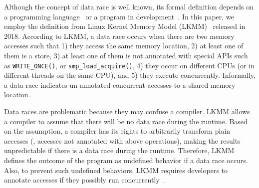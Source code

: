 %
Although the concept of data race is well known, its formal definition
depends on a programming language~\cite{C-standard-n2310,
  java-standard} or a program in development~\cite{lkmm}. In this
paper, we employ the definition from Linux Kernel Memory Model
(LKMM)~\cite{lkmm} released in 2018. According to LKMM, a data race
occurs when there are two memory accesses such that 1) they access the
same memory location, 2) at least one of them is a store, 3) at least
one of them is not annotated with special APIs such as
\texttt{WRITE_ONCE()}, or \texttt{smp_load_acquire()}, 4) they occur
on different CPUs (or in different threads on the same CPU), and 5)
they execute concurrently.
%
Informally, a data race indicates un-annotated concurrent accesses to
a shared memory location.

Data races are problematic because they may confuse a compiler.  LKMM
allows a compiler to assume that there will be no data race during the
runtime. Based on the assumption, a compiler has its rights to
arbitrarily transform plain accesses (\ie, accesses not annotated with
above operations), making the results unpredictable if there is a data
race during the runtime.
%
Therefore, LKMM defines the outcome of the program as undefined
behavior if a data race occurs.
%
Also, to prevent such undefined behaviors, LKMM requires developers to
annotate accesses if they possibly run
concurrently~\cite{data-race-fix1, data-race-fix2, data-race-fix3}.





